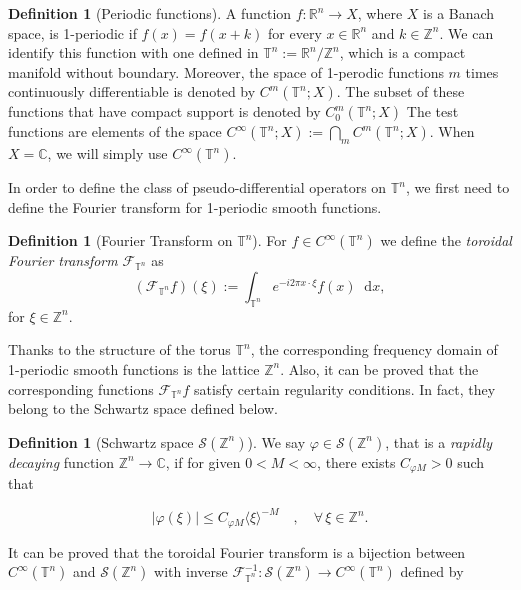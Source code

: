 \documentclass[12pt, reqno]{amsart}
\theoremstyle{definition}
\newtheorem{definition}[theorem]{Definition}
\theoremstyle{remark}
\numberwithin{equation}{section}
\newcommand*\diff{\mathop{}\!\mathrm{d}}
\begin{document}
\begin{definition}[Periodic functions] 
    A function $f: \mathbb{R}^n \rightarrow X$, where $X$ is a Banach space, is 1-periodic if $f(x) = f(x + k)$ for every $ x \in \mathbb{R}^n $ and $ k \in \mathbb{Z}^n $. We can identify this function with one defined in $\mathbb{T}^n := \mathbb{R}^n / \mathbb{Z}^n $, which is a compact manifold without boundary. Moreover, the space of 1-perodic functions $m$ times continuously differentiable is denoted by $C^m(\mathbb{T}^n;X)$. The subset of these functions that have compact support is denoted by $C^m_0(\mathbb{T}^n;X)$  The test functions are elements of the space $C^\infty(\mathbb{T}^n;X) := \bigcap_m C^m(\mathbb{T}^n;X)$. When $X=\mathbb{C}$, we will simply use $C^\infty(\mathbb{T}^n)$.
\end{definition}
In order to define the class of pseudo-differential operators on $\mathbb{T}^n$, we first need to define the Fourier transform for 1-periodic smooth functions.
\begin{definition}[Fourier Transform on $\mathbb{T}^n$]
    For $f \in C^\infty(\mathbb{T}^n)$ we define the  \textit{toroidal Fourier transform} $\mathcal{F}_{\mathbb{T}^n}$ as 
    \begin{equation*}
        (\mathcal{F}_{\mathbb{T}^n}f)(\xi) := \int_{\mathbb{T}^n} e^{-i2\pi x \cdot \xi}f(x)\diff x, 
    \end{equation*}
    for $\xi \in \mathbb{Z}^n$.
\end{definition}
Thanks to the structure of the torus $\mathbb{T}^n$, the corresponding frequency domain of 1-periodic smooth functions is the lattice $\mathbb{Z}^n$. Also, it can be proved that the corresponding functions $\mathcal{F}_{\mathbb{T}^n}f$ satisfy certain regularity conditions. In fact, they belong to the Schwartz space defined below. 
\begin{definition}[Schwartz space $\mathcal{S}(\mathbb{Z}^n) $]
    We say $\varphi \in \mathcal{S}(\mathbb{Z}^n)$, that is a \textit{rapidly decaying} function $\mathbb{Z}^n \rightarrow \mathbb{C}$, if for given $0<M<\infty$, there exists $C_{\varphi M} > 0$ such that 

    \begin{equation*}
        |\varphi(\xi)| \leq C_{\varphi M} \langle\xi\rangle^{-M} \quad , \quad \forall\, \xi \in \mathbb{Z}^n.
    \end{equation*}
\end{definition}
It can be proved that the toroidal Fourier transform is a bijection between $C^\infty(\mathbb{T}^n)$ and $\mathcal{S}(\mathbb{Z}^n)$ with inverse  $\mathcal{F}_{\mathbb{T}^n}^{-1}:  \mathcal{S}(\mathbb{Z}^n) \rightarrow C^\infty(\mathbb{T}^n)$ defined by
\end{document}
